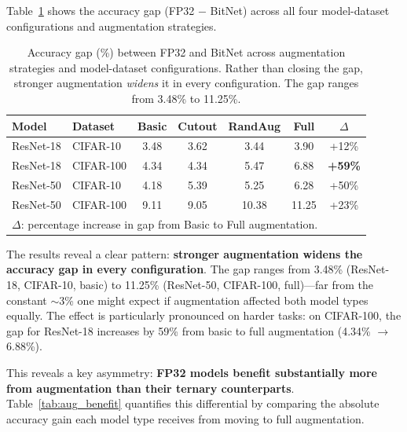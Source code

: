 \documentclass[10pt]{article}
\begin{document}
Table~\ref{tab:augmentation} shows the accuracy gap (FP32 $-$ BitNet) across all four model-dataset configurations and augmentation strategies.

\begin{table}[ht]
\centering
\caption{Accuracy gap (\%) between FP32 and BitNet across augmentation strategies and model-dataset configurations. Rather than closing the gap, stronger augmentation \emph{widens} it in every configuration. The gap ranges from 3.48\% to 11.25\%.}
\label{tab:augmentation}
\begin{tabular}{llccccc}
\toprule
Model & Dataset & Basic & Cutout & RandAug & Full & $\Delta$ \\
\midrule
ResNet-18 & CIFAR-10  & 3.48 & 3.62 & 3.44 & 3.90 & +12\% \\
ResNet-18 & CIFAR-100 & 4.34 & 4.34 & 5.47 & 6.88 & \textbf{+59\%} \\
ResNet-50 & CIFAR-10  & 4.18 & 5.39 & 5.25 & 6.28 & +50\% \\
ResNet-50 & CIFAR-100 & 9.11 & 9.05 & 10.38 & 11.25 & +23\% \\
\bottomrule
\multicolumn{7}{l}{\footnotesize $\Delta$: percentage increase in gap from Basic to Full augmentation.}
\end{tabular}
\end{table}

The results reveal a clear pattern: \textbf{stronger augmentation widens the accuracy gap in every configuration}. The gap ranges from 3.48\% (ResNet-18, CIFAR-10, basic) to 11.25\% (ResNet-50, CIFAR-100, full)---far from the constant $\sim$3\% one might expect if augmentation affected both model types equally. The effect is particularly pronounced on harder tasks: on CIFAR-100, the gap for ResNet-18 increases by 59\% from basic to full augmentation (4.34\% $\to$ 6.88\%).

This reveals a key asymmetry: \textbf{FP32 models benefit substantially more from augmentation than their ternary counterparts}. Table~\ref{tab:aug_benefit} quantifies this differential by comparing the absolute accuracy gain each model type receives from moving to full augmentation.
\end{document}
